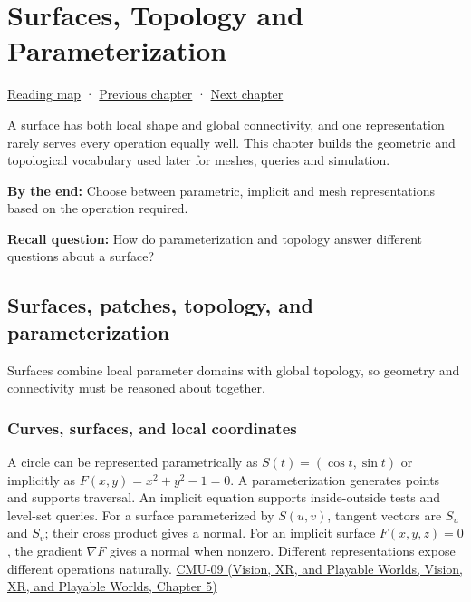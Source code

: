 \hypertarget{03-visual-computing-i-ch002}{}
\chapter{Surfaces, Topology and Parameterization}\label{stagechapter:03-visual-computing-i-ch002}\label{03-visual-computing-i-ch002-surfaces-topology-and-parameterization}

\hyperref[volume-reading-map]{Reading map} · \hyperref[03-visual-computing-i-ch001-from-worlds-to-images-and-inference]{Previous chapter} · \hyperref[03-visual-computing-i-ch003-lens-optics-and-image-formation]{Next chapter}

A surface has both local shape and global connectivity, and one representation rarely serves every operation equally well. This chapter builds the geometric and topological vocabulary used later for meshes, queries and simulation.

\textbf{By the end:} Choose between parametric, implicit and mesh representations based on the operation required.

\textbf{Recall question:} How do parameterization and topology answer different questions about a surface?

\section{Surfaces, patches, topology, and parameterization}\label{03-visual-computing-i-ch002-surfaces-patches-topology-and-parameterization}

Surfaces combine local parameter domains with global topology, so geometry and connectivity must be reasoned about together.

\subsection{Curves, surfaces, and local coordinates}\label{03-visual-computing-i-ch002-curves-surfaces-and-local-coordinates}

A circle can be represented parametrically as \(S(t)=(\cos t,\sin t)\) or implicitly as \(F(x,y)=x^2+y^2-1=0\). A parameterization generates points and supports traversal. An implicit equation supports inside-outside tests and level-set queries. For a surface parameterized by \(S(u,v)\), tangent vectors are \(S_u\) and \(S_v\); their cross product gives a normal. For an implicit surface \(F(x,y,z)=0\), the gradient \(\nabla F\) gives a normal when nonzero. Different representations expose different operations naturally. \href{../07-Vision-XR-and-Playable-Worlds/main.pdf\#nameddest=04-visual-computing-ii-ch036-cmu-09---introduction-to-geometry}{CMU-09 (Vision, XR, and Playable Worlds, Vision, XR, and Playable Worlds, Chapter 5)}

